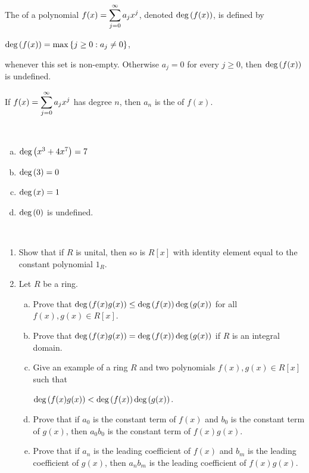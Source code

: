 \documentclass[11pt,fleqn,dvipsnames,usenames]{article}
\begin{document}
%
\begin{definition} The  of a polynomial $f(x) = \displaystyle\sum\limits_{j=0}^{\infty}a_{j}x^{j}$, denoted $\text{deg}\left(f(x)\right)$, is defined by
\begin{center}
 $\text{deg}\left(f(x)\right) = \max \left\{j\geq 0:a_{j} \neq 0\right\}$,
 \end{center}
whenever this set is non-empty.  Otherwise $a_{j} = 0$ for every $j\geq 0$, then $\text{deg}\left(f(x)\right)$ is undefined.
\end{definition}

\terminology If $f(x) = \displaystyle\sum\limits_{j=0}^{\infty}a_{j}x^{j}$ has degree $n$, then $a_{n}$ is the  of $f(x)$.
\vsp

\begin{examples}~
\begin{multicols}{2}
\begin{enumerate}[(a)]
\item $\text{deg}\left(x^3 + 4x^7\right) = 7$
\item $\text{deg}\left(3\right) = 0$
\item $\text{deg}\left(x\right) = 1$
\item $\text{deg}\left(0\right)$ is undefined.
\end{enumerate}
\end{multicols}
\end{examples}

\begin{exercises}\label{sumofdegreesexercises}~
\begin{enumerate}[1.]
\item Show that if $R$ is unital, then so is $R[x]$ with identity element equal to the constant polynomial $1_{R}$.
\item \label{sumofdegrees} Let $R$ be a ring.
\begin{enumerate}[(a)]
\item Prove that $\text{deg}\left(f(x)g(x)\right)\leq \text{deg}\left(f(x)\right)\text{deg}\left(g(x)\right)$ for all $f(x),g(x)\in R[x]$.
\item Prove that $\text{deg}\left(f(x)g(x)\right)= \text{deg}\left(f(x)\right)\text{deg}\left(g(x)\right)$ if $R$ is an integral domain.\label{sumofdegreesdomain}
\item Give an example of a ring $R$ and two polynomials $f(x),g(x)\in R[x]$ such that
\begin{center}
$\text{deg}\left(f(x)g(x)\right) < \text{deg}\left(f(x)\right)\text{deg}\left(g(x)\right)$.
\end{center}
\item Prove that if $a_{0}$ is the constant term of $f(x)$ and $b_{0}$ is the constant term of $g(x)$, then $a_{0}b_{0}$ is the constant term of $f(x)g(x)$.
\item Prove that if $a_{n}$ is the leading coefficient of $f(x)$ and $b_{m}$ is the leading coefficient of $g(x)$, then $a_{n}b_{m}$ is the leading coefficient of $f(x)g(x)$.
\end{enumerate}
\end{enumerate}
\end{exercises}
\newpage
\end{document}
